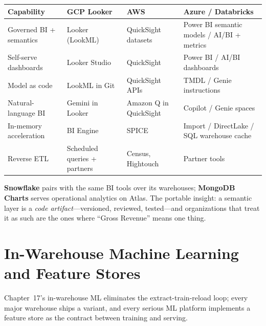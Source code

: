 \begin{center}
\footnotesize
\begin{tabular}{@{}p{2.8cm}p{3.0cm}p{3.0cm}p{3.4cm}@{}}
\toprule
\textbf{Capability} & \textbf{GCP Looker} & \textbf{AWS} & \textbf{Azure / Databricks} \\
\midrule
Governed BI + semantics & Looker (LookML) & QuickSight datasets & Power BI semantic models / AI/BI + metrics \\
Self-serve dashboards & Looker Studio & QuickSight & Power BI / AI/BI dashboards \\
Model as code & LookML in Git & QuickSight APIs & TMDL / Genie instructions \\
Natural-language BI & Gemini in Looker & Amazon Q in QuickSight & Copilot / Genie spaces \\
In-memory acceleration & BI Engine & SPICE & Import / DirectLake / SQL warehouse cache \\
Reverse ETL & Scheduled queries + partners & Census, Hightouch & Partner tools \\
\bottomrule
\end{tabular}
\end{center}

\noindent \textbf{Snowflake} pairs with the same BI tools over its warehouses; \textbf{MongoDB
Charts} serves operational analytics on Atlas. The portable insight: a semantic layer is a
\emph{code artifact}---versioned, reviewed, tested---and organizations that treat it as such are
the ones where ``Gross Revenue'' means one thing.

\section{In-Warehouse Machine Learning and Feature Stores}
%
Chapter~17's in-warehouse ML eliminates the extract-train-reload loop; every major warehouse ships
a variant, and every serious ML platform implements a feature store as the contract between
training and serving.

